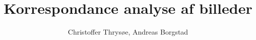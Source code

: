 \documentclass[11pt,a4paper,oldfontcommands,twosided,article]{memoir}
\title{Korrespondance analyse af billeder}
\author{Christoffer Thrysøe, Andreas Borgstad}
\date{} %
\begin{document}
\maketitle %
\newpage
\renewcommand{\contentsname}{Indholdsfortegnelse}
\setcounter{secnumdepth}{3}
\setcounter{tocdepth}{2}
\tableofcontents*
\newpage
{}
\raggedbottom
\newpage
\raggedbottom
\newpage
\raggedbottom
\newpage
\raggedbottom
\newpage%
\raggedbottom
\newpage%
\raggedbottom
\newpage
\raggedbottom
\newpage

\nocite{}

\newpage
\appendix
\def\@chapapp{Appendix}

\end{document}

